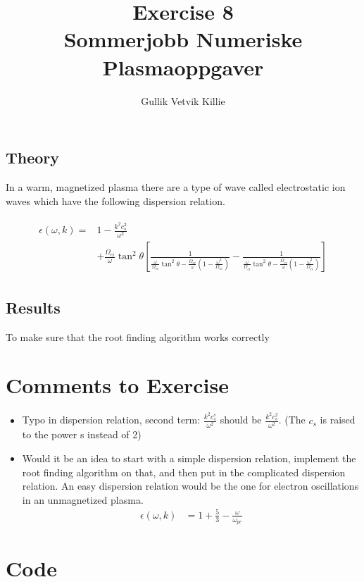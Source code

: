 \documentclass[x11names]{article}
\title{ Exercise 8 \\ Sommerjobb Numeriske Plasmaoppgaver }
\author{Gullik Vetvik Killie
		}
\begin{document}
\maketitle

\section{}

\subsection{Theory}
  In a warm, magnetized plasma there are a type of wave called electrostatic ion waves which have the following dispersion relation.

  \begin{align}
    \begin{split}
      \epsilon(\omega,k) = &1- \frac{k^2c_s^2}{\omega^2} 
      \\
      & + \frac{\Omega_{ci}}{\omega}\tan^2\theta \left[  \frac{1}{ \frac{\omega}{\Omega_{ce}}\tan^2 \theta - \frac{\Omega_{ce}}{\omega} \left( 1 - \frac{\omega^2}{\Omega_{ce}} \right) }  
                                                        -\frac{1}{ \frac{\omega}{\Omega_{ci}}\tan^2 \theta - \frac{\Omega_{ci}}{\omega} \left( 1 - \frac{\omega^2}{\Omega_{ci}} \right) } \right]
    \end{split}
  \end{align}

\subsection{Results}
  To make sure that the root finding algorithm works correctly 


\appendix
\section{Comments to Exercise}
  
  \begin{itemize}
    \item Typo in dispersion relation, second term: \(\frac{k^2c_s^s}{\omega^2}\) should be \(\frac{k^2c_s^2}{\omega^2}\). (The \(c_s\) is raised to the power s instead of 2)
    \item Would it be an idea to start with a simple dispersion relation, implement the root finding algorithm on that, and then put in the complicated dispersion relation. An easy dispersion relation would be the one for electron oscillations in an unmagnetized plasma.
    \begin{align}
      \epsilon(\omega, k) &= 1 + \frac{5}{3} - \frac{\omega}{\omega_{pe}}
    \end{align}
  \end{itemize}



\section{Code}
  \label{sec:code}
  
\end{document}
